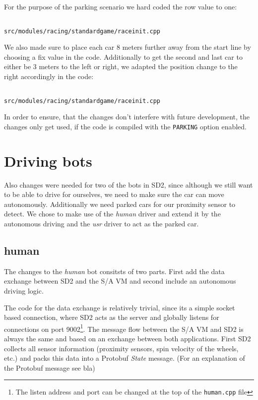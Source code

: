 \documentclass[paper=a4, fontsize=11pt]{scrreprt}
\begin{document}
For the purpose of the parking scenario we hard coded the row value to one:
\begin{listing}[ht]
  \inputminted[firstline=309,linenos=true,lastline=311,gobble=1]{c++}{../../../simulators/speed-dreams/src/modules/racing/standardgame/raceinit.cpp}
  \caption{\texttt{src/modules/racing/standardgame/raceinit.cpp}}
\end{listing}

We also made sure to place each car 8 meters further away from the start line by choosing a fix value in the code.
Additionally to get the second and last car to either be 3 meters to the left or right,
we adapted the position change to the right accordingly in the code:
\begin{listing}[ht]
  \inputminted[firstline=316,linenos=true,lastline=327,gobble=4]{c++}{../../../simulators/speed-dreams/src/modules/racing/standardgame/raceinit.cpp}
  \caption{\texttt{src/modules/racing/standardgame/raceinit.cpp}}
\end{listing}

In order to ensure, that the changes don't interfere with future development,
the changes only get used, if the code is compiled with the \texttt{PARKING} option enabled.

\section{Driving bots}
Also changes were needed for two of the bots in SD2,
since although we still want to be able to drive for ourselves,
we need to make sure the car can move autonomously.
Additionally we need parked cars for our proximity sensor to detect.
We chose to make use of the \textit{human} driver and extend it by the autonomous driving
and the \textit{usr} driver to act as the parked car.

\subsection{human}
The changes to the \textit{human} bot consitsts of two parts.
First add the data exchange between SD2 and the S/A VM
and second include an autonomous driving logic.

The code for the data exchange is relatively trivial,
since its a simple socket based connection,
where SD2 acts as the server and globally listens for connections on port 9002\footnote{The listen address and port can be changed at the top of the \texttt{human.cpp} file}.
The message flow between the S/A VM and SD2 is always the same
and based on an exchange between both applications.
First SD2 collects all sensor information (proximity sensors, spin velocity of the wheels, etc.)
and packs this data into a Protobuf \textit{State} message.
(For an explanation of the Protobuf message see bla) %
\end{document}
